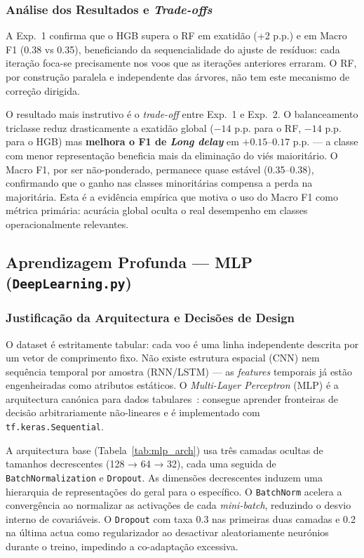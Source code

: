 \documentclass[conference]{IEEEtran}
\begin{document}
\subsubsection{Análise dos Resultados e \textit{Trade-offs}}
A Exp.~1 confirma que o HGB supera o RF em exatidão (+2 p.p.) e em Macro F1
(0.38 vs 0.35), beneficiando da sequencialidade do ajuste de resíduos: cada
iteração foca-se precisamente nos voos que as iterações anteriores erraram.
O RF, por construção paralela e independente das árvores, não tem este mecanismo
de correção dirigida.

O resultado mais instrutivo é o \textit{trade-off} entre Exp.~1 e Exp.~2.
O balanceamento triclasse reduz drasticamente a exatidão global ($-14$ p.p. para
o RF, $-14$ p.p. para o HGB) mas \textbf{melhora o F1 de \textit{Long delay}}
em $+0.15$–$0.17$ p.p. — a classe com menor representação beneficia mais da
eliminação do viés maioritário. O Macro F1, por ser não-ponderado, permanece
quase estável (0.35–0.38), confirmando que o ganho nas classes minoritárias
compensa a perda na majoritária. Esta é a evidência empírica que motiva o uso
do Macro F1 como métrica primária: acurácia global oculta o real desempenho
em classes operacionalmente relevantes.

\subsection{Aprendizagem Profunda — MLP (\texttt{DeepLearning.py})}

\subsubsection{Justificação da Arquitectura e Decisões de Design}
O dataset é estritamente tabular: cada voo é uma linha independente descrita
por um vetor de comprimento fixo. Não existe estrutura espacial (CNN) nem
sequência temporal por amostra (RNN/LSTM) — as \textit{features} temporais já
estão engenheiradas como atributos estáticos. O \textit{Multi-Layer Perceptron}
(MLP) é a arquitectura canónica para dados tabulares~\cite{tensorflow}: consegue
aprender fronteiras de decisão arbitrariamente não-lineares e é implementado
com \texttt{tf.keras.Sequential}.

A arquitectura base (Tabela~\ref{tab:mlp_arch}) usa três camadas ocultas de
tamanhos decrescentes (128 → 64 → 32), cada uma seguida de
\texttt{BatchNormalization} e \texttt{Dropout}. As dimensões decrescentes
induzem uma hierarquia de representações do geral para o específico. O
\texttt{BatchNorm} acelera a convergência ao normalizar as activações de cada
\textit{mini-batch}, reduzindo o desvio interno de covariáveis. O
\texttt{Dropout} com taxa 0.3 nas primeiras duas camadas e 0.2 na última
actua como regularizador ao desactivar aleatoriamente neurónios durante o
treino, impedindo a co-adaptação excessiva.
\end{document}
